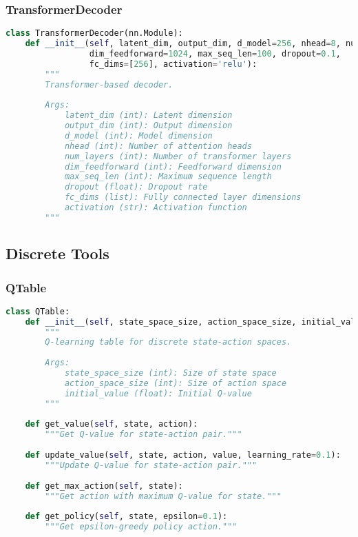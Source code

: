 \subsubsection{TransformerDecoder}

\begin{lstlisting}[language=python]
class TransformerDecoder(nn.Module):
    def __init__(self, latent_dim, output_dim, d_model=256, nhead=8, num_layers=6,
                 dim_feedforward=1024, max_seq_len=100, dropout=0.1,
                 fc_dims=[256], activation='relu'):
        """
        Transformer-based decoder.
        
        Args:
            latent_dim (int): Latent dimension
            output_dim (int): Output dimension
            d_model (int): Model dimension
            nhead (int): Number of attention heads
            num_layers (int): Number of transformer layers
            dim_feedforward (int): Feedforward dimension
            max_seq_len (int): Maximum sequence length
            dropout (float): Dropout rate
            fc_dims (list): Fully connected layer dimensions
            activation (str): Activation function
        """
\end{lstlisting}

\subsection{Discrete Tools}

\subsubsection{QTable}

\begin{lstlisting}[language=python]
class QTable:
    def __init__(self, state_space_size, action_space_size, initial_value=0.0):
        """
        Q-learning table for discrete state-action spaces.
        
        Args:
            state_space_size (int): Size of state space
            action_space_size (int): Size of action space
            initial_value (float): Initial Q-value
        """
    
    def get_value(self, state, action):
        """Get Q-value for state-action pair."""
    
    def update_value(self, state, action, value, learning_rate=0.1):
        """Update Q-value for state-action pair."""
    
    def get_max_action(self, state):
        """Get action with maximum Q-value for state."""
    
    def get_policy(self, state, epsilon=0.1):
        """Get epsilon-greedy policy action."""
\end{lstlisting}

